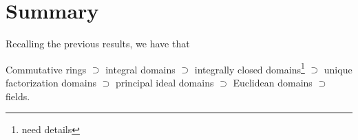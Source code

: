 







\section{Summary}

Recalling the previous results, we have that

Commutative rings $\supset$ integral domains $\supset$ integrally closed domains\footnote{need details} $\supset$ unique factorization domains $\supset$ principal ideal domains $\supset$ Euclidean
domains $\supset$ fields.

